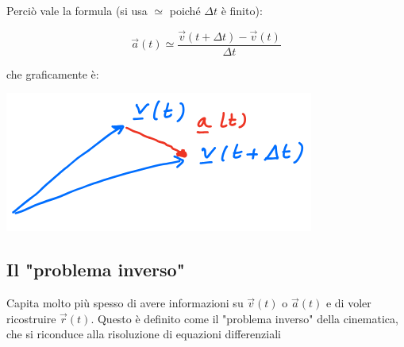 \documentclass{subfiles}
\begin{document}
\noindent
Perciò vale la formula (si usa $\simeq$ poiché $\Delta t$ è finito):

$$
\vec{a}(t) \simeq \frac{\vec{v}(t + \Delta t) - \vec{v}(t)}{\Delta t}
$$

\noindent
che graficamente è:

\includegraphics[width=\columnwidth]{rappresentazione-accelerazione-grafica-approssimazione}

\subsection{Il "problema inverso"}

Capita molto più spesso di avere informazioni su $\vec{v}(t)$ o $\vec{a}(t)$ e di voler ricostruire $\vec{r}(t)$. Questo è definito come il "problema inverso" della cinematica, che si riconduce alla risoluzione di equazioni differenziali
\end{document}
